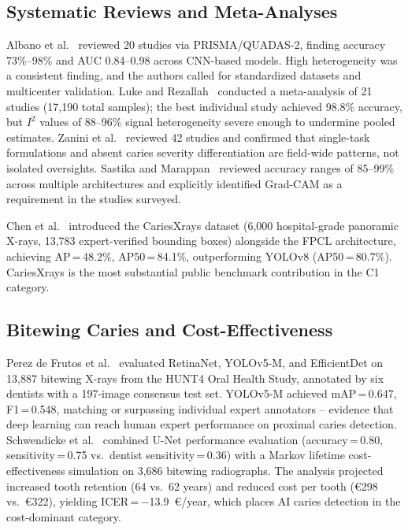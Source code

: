 \documentclass[conference]{IEEEtran}
\begin{document}
\subsection{Systematic Reviews and Meta-Analyses}

Albano et al.~\cite{albano2024artificial} reviewed 20 studies via
PRISMA/QUADAS-2, finding accuracy 73\%--98\% and AUC 0.84--0.98 across
CNN-based models. High heterogeneity was a consistent finding, and the
authors called for standardized datasets and multicenter validation. Luke and
Rezallah~\cite{luke2025accuracy} conducted a meta-analysis of 21 studies
(17,190 total samples); the best individual study achieved
98.8\% accuracy, but $I^2$ values of 88--96\% signal heterogeneity
severe enough to undermine pooled estimates. Zanini et
al.~\cite{zanini2024systematic} reviewed 42 studies and confirmed that
single-task formulations and absent caries severity differentiation are
field-wide patterns, not isolated oversights. Sastika and Marappan~\cite{sastika2025ai}
reviewed accuracy ranges of 85--99\% across multiple architectures and
explicitly identified Grad-CAM as a requirement in the studies surveyed.

Chen et al.~\cite{chen2024cariesxrays} introduced the CariesXrays
dataset (6,000 hospital-grade panoramic X-rays, 13,783 expert-verified
bounding boxes) alongside the FPCL architecture, achieving
AP\,=\,48.2\%, AP50\,=\,84.1\%, outperforming YOLOv8
(AP50\,=\,80.7\%). CariesXrays is the most substantial public benchmark
contribution in the C1 category.

\subsection{Bitewing Caries and Cost-Effectiveness}

Perez de Frutos et al.~\cite{perez2024ai} evaluated RetinaNet,
YOLOv5-M, and EfficientDet on 13,887 bitewing X-rays from the HUNT4
Oral Health Study, annotated by six dentists with a 197-image consensus
test set. YOLOv5-M achieved mAP\,=\,0.647, F1\,=\,0.548, matching or
surpassing individual expert annotators -- evidence that deep learning
can reach human expert performance on proximal caries detection.
Schwendicke et al.~\cite{schwendicke2021cost} combined U-Net
performance evaluation (accuracy\,=\,0.80, sensitivity\,=\,0.75 vs.\
dentist sensitivity\,=\,0.36) with a Markov lifetime cost-effectiveness
simulation on 3,686 bitewing radiographs. The analysis projected
increased tooth retention (64 vs.\ 62 years) and reduced cost per tooth
(\euro298 vs.\ \euro322), yielding ICER\,=\,$-$13.9~\euro/year,
which places AI caries detection in the cost-dominant category.
\end{document}
